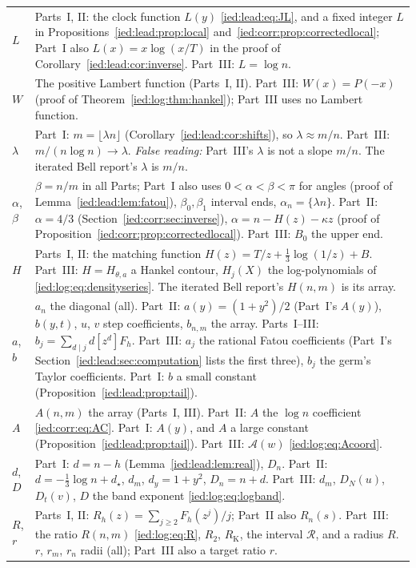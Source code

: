 \documentclass[11pt,letterpaper]{article}
\theoremstyle{remark}\newtheorem{remark}[theorem]{Remark}
\begin{document}
\begin{longtable}{@{}>{\raggedright\arraybackslash}p{} >{\raggedright\arraybackslash}p{}@{}}
$L$ & Parts~I, II: the clock function $L(y)$ \eqref{ied:lead:eq:JL}, and a fixed integer $L$ in Propositions~\ref{ied:lead:prop:local} and~\ref{ied:corr:prop:correctedlocal}; Part~I also $L(x)=x\log(x/T)$ in the proof of Corollary~\ref{ied:lead:cor:inverse}. Part~III: $L=\log n$.\\
$W$ & The positive Lambert function (Parts~I, II). Part~III: $W(x)=P(-x)$ (proof of Theorem~\ref{ied:log:thm:hankel}); Part~III uses no Lambert function.\\
$\lambda$ & Part~I: $m=\lfloor\lambda n\rfloor$ (Corollary~\ref{ied:lead:cor:shifts}), so $\lambda\approx m/n$. Part~III: $m/(n\log n)\to\lambda$. \emph{False reading:} Part~III's $\lambda$ is not a slope $m/n$. The iterated Bell report's $\lambda$ is $m/n$.\\
$\alpha$, $\beta$ & $\beta=n/m$ in all Parts; Part~I also uses $0<\alpha<\beta<\pi$ for angles (proof of Lemma~\ref{ied:lead:lem:fatou}), $\beta_0,\beta_1$ interval ends, $\alpha_n=\{\lambda n\}$. Part~II: $\alpha=4/3$ (Section~\ref{ied:corr:sec:inverse}), $\alpha=n-H(z)-\kappa z$ (proof of Proposition~\ref{ied:corr:prop:correctedlocal}). Part~III: $B_0$ the upper end.\\
$H$ & Parts~I, II: the matching function $H(z)=T/z+\frac13\log(1/z)+B$. Part~III: $H=H_{\theta,a}$ a Hankel contour, $H_j(X)$ the log-polynomials of \eqref{ied:log:eq:densityseries}. The iterated Bell report's $H(n,m)$ is its array.\\
$a$, $b$ & $a_n$ the diagonal (all). Part~II: $a(y)=(1+y^2)/2$ (Part~I's $A(y)$), $b(y,t)$, $u$, $v$ step coefficients, $b_{n,m}$ the array. Parts~I--III: $b_j=\sum_{d\mid j}d[z^d]F_h$. Part~III: $a_j$ the rational Fatou coefficients (Part~I's Section~\ref{ied:lead:sec:computation} lists the first three), $b_j$ the germ's Taylor coefficients. Part~I: $b$ a small constant (Proposition~\ref{ied:lead:prop:tail}).\\
$A$ & $A(n,m)$ the array (Parts~I, III). Part~II: $A$ the $\log n$ coefficient \eqref{ied:corr:eq:AC}. Part~I: $A(y)$, and $A$ a large constant (Proposition~\ref{ied:lead:prop:tail}). Part~III: $\mathcal A(w)$ \eqref{ied:log:eq:Acoord}.\\
$d$, $D$ & Part~I: $d=n-h$ (Lemma~\ref{ied:lead:lem:real}), $D_n$. Part~II: $d=-\frac13\log n+d_\star$, $d_m$, $d_y=1+y^2$, $D_n=n+d$. Part~III: $d_m$, $D_N(u)$, $D_t(v)$, $D$ the band exponent \eqref{ied:log:eq:logband}.\\
$R$, $r$ & Parts~I, II: $R_h(z)=\sum_{j\ge2}F_h(z^j)/j$; Part~II also $R_n(s)$. Part~III: the ratio $R(n,m)$ \eqref{ied:log:eq:R}, $R_2$, $R_{\mathrm K}$, the interval $\mathcal R$, and a radius $R$. $r$, $r_m$, $r_n$ radii (all); Part~III also a target ratio $r$.\\

\end{longtable}
\end{document}
